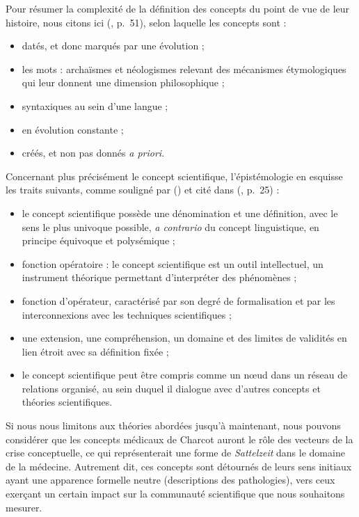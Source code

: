 Pour résumer la complexité de la définition des concepts du point de vue de leur histoire, nous citons ici \citeauthor{bal2002travelling} (\citeyear{bal2002travelling}, p.~51), selon laquelle les concepts sont :
\begin{itemize}
\item datés, et donc marqués par une évolution ;
\item les mots : archaïsmes et néologismes relevant des mécanismes étymologiques qui leur donnent une dimension philosophique ;
\item syntaxiques au sein d'une langue ;
\item en évolution constante ;
\item créés, et non pas donnés \textit{a priori}.
\end{itemize}
\medskip
Concernant plus précisément le concept scientifique, l'épistémologie en esquisse les traits suivants, comme souligné par \citeauthor{rumelhard1986} (\citeyear{rumelhard1986}) et cité dans \citeauthor{astolfi2008chapitre} (\citeyear{astolfi2008chapitre}, p.~25) :
\begin{itemize}
\item le concept scientifique possède une dénomination et une définition, avec le sens le plus univoque possible, \textit{a contrario} du concept linguistique, en principe équivoque et polysémique ;
\item fonction opératoire : le concept scientifique est un outil intellectuel, un instrument théorique permettant d'interpréter des phénomènes ;
\item fonction d'opérateur, caractérisé par son degré de formalisation et par les interconnexions avec les techniques scientifiques ;
\item une extension, une compréhension, un domaine et des limites de validités en lien étroit avec sa définition fixée ;
\item le concept scientifique peut être compris comme un n\oe{}ud dans un réseau de relations organisé, au sein duquel il dialogue avec d'autres concepts et théories scientifiques.
\end{itemize}

Si nous nous limitons aux théories abordées jusqu'à maintenant, nous pouvons considérer que les concepts médicaux de Charcot auront le rôle des vecteurs de la crise conceptuelle, ce qui représenterait une forme de \textit{Sattelzeit} dans le domaine de la médecine. Autrement dit, ces concepts sont détournés de leurs sens initiaux ayant une apparence formelle neutre (descriptions des pathologies), vers ceux exerçant un certain impact sur la communauté scientifique que nous souhaitons mesurer.


